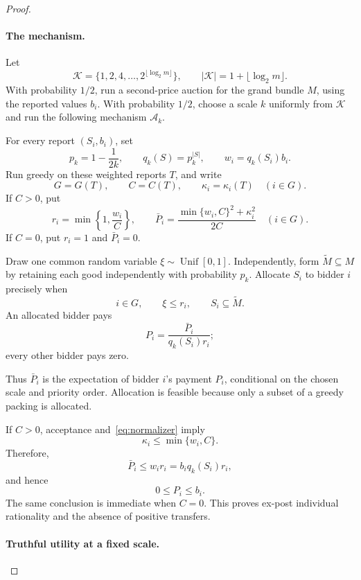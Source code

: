 \documentclass[format=acmsmall, review=false]{acmart}
\begin{document}
\begin{proof}
\paragraph{The mechanism.}

Let
\[
\mathcal K=\bigl\{1,2,4,\ldots,2^{\lfloor\log_2m\rfloor}\bigr\},
\qquad
|\mathcal K|=1+\lfloor\log_2m\rfloor.
\]
With probability \(1/2\), run a second-price auction for the
grand bundle \(M\), using the reported values \(b_i\).
With probability \(1/2\), choose a scale \(k\) uniformly from
\(\mathcal K\) and run the following mechanism
\(\mathcal A_k\).

For every report \((S_i,b_i)\), set
\[
p_k=1-\frac{1}{2k},
\qquad
q_k(S)=p_k^{|S|},
\qquad
w_i=q_k(S_i)b_i.
\]
Run greedy on these weighted reports \(T\), and write
\[
G=G(T),\qquad
C=C(T),\qquad
\kappa_i=\kappa_i(T)\quad(i\in G).
\]
If \(C>0\), put
\begin{equation}\label{eq:retention-payment}
r_i=\min\left\{1,\frac{w_i}{C}\right\},
\qquad
\bar P_i=\frac{\min\{w_i,C\}^2+\kappa_i^2}{2C}
\quad(i\in G).
\end{equation}
If \(C=0\), put \(r_i=1\) and \(\bar P_i=0\).

Draw one common random variable
\(\xi\sim\operatorname{Unif}[0,1]\).
Independently, form \(\widetilde M\subseteq M\) by retaining each good
independently with probability \(p_k\). Allocate \(S_i\) to
bidder \(i\) precisely when
\[
i\in G,\qquad \xi\le r_i,\qquad S_i\subseteq\widetilde M.
\]
An allocated bidder pays
\begin{equation}\label{eq:actual-payment}
P_i=\frac{\bar P_i}{q_k(S_i)r_i};
\end{equation}
every other bidder pays zero.

Thus \(\bar P_i\) is the expectation of bidder \(i\)'s payment \(P_i\),
conditional on the chosen scale and priority order.
Allocation is feasible because only a subset of a greedy
packing is allocated.

If \(C>0\), acceptance and~\eqref{eq:normalizer} imply
\[
\kappa_i\le\min\{w_i,C\}.
\]
Therefore,
\[
\bar P_i\le w_i r_i=b_iq_k(S_i)r_i,
\]
and hence
\[
0\le P_i\le b_i.
\]
The same conclusion is immediate when \(C=0\).
This proves ex-post individual rationality and the absence
of positive transfers.

\paragraph{Truthful utility at a fixed scale.}


\end{proof}
\end{document}
